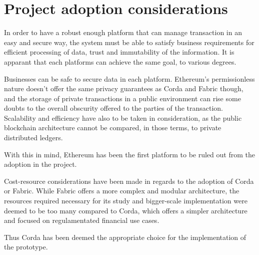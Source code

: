 \section{Project adoption considerations}

In order to have a robust enough platform that can manage transaction in an easy and secure way, the system must be able to satisfy business requirements for efficient processing of data, trust and immutability of the information.
It is apparant that each platforms can achieve the same goal, to various degrees.

Businesses can be safe to secure data in each platform. Ethereum's permissionless nature doesn't offer the same privacy guarantees as Corda and Fabric though, and the storage of private transactions in a public environment can rise some doubts to the overall obscurity offered to the parties of the transaction. Scalability and efficiency have also to be taken in consideration, as the public blockchain architecture cannot be compared, in those terms, to private distributed ledgers.

With this in mind, Ethereum has been the first platform to be ruled out from the adoption in the project.

Cost-resource considerations have been made in regards to the adoption of Corda or Fabric. While Fabric offers a more complex and modular architecture, the resources required necessary for its study and bigger-scale implementation were deemed to be too many compared to Corda, which offers a simpler architecture and focused on regulamentated financial use cases.

Thus Corda has been deemed the appropriate choice for the implementation of the prototype.
